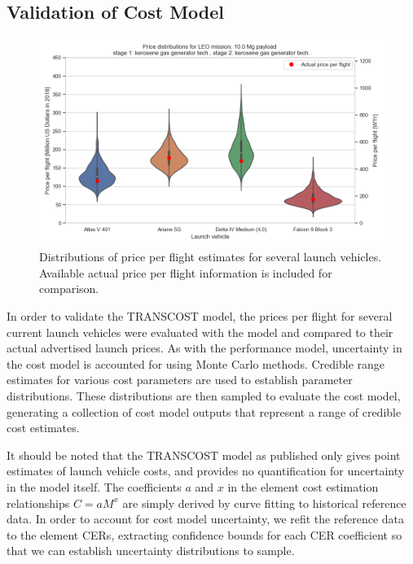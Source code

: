 \documentclass[conf]{new-aiaa}
\begin{document}
\begin{multicols}{2}
\subsection{Validation of Cost Model}

\begin{figure}
    \centering
    \includegraphics[width=\textwidth]{../../lvreuse/analysis/cost/plots/vehicle_ppf_validation}
    \caption{\label{fig:vehicle_ppf_validation} Distributions of price per flight estimates for several launch vehicles. Available actual price per flight information is included for comparison.}
\end{figure}

In order to validate the TRANSCOST model, the prices per flight for several current launch vehicles were evaluated with the model and compared to their actual advertised launch prices. As with the performance model, uncertainty in the cost model is accounted for using Monte Carlo methods. Credible range estimates for various cost parameters are used to establish parameter distributions. These distributions are then sampled to evaluate the cost model, generating a collection of cost model outputs that represent a range of credible cost estimates.

It should be noted that the TRANSCOST model as published only gives point estimates of launch vehicle costs, and provides no quantification for uncertainty in the model itself. The coefficients $a$ and $x$ in the element cost estimation relationships $C = a M^x$ are simply derived by curve fitting to historical reference data. In order to account for cost model uncertainty, we refit the reference data to the element CERs, extracting confidence bounds for each CER coefficient so that we can establish uncertainty distributions to sample. 


\end{multicols}
\end{document}
